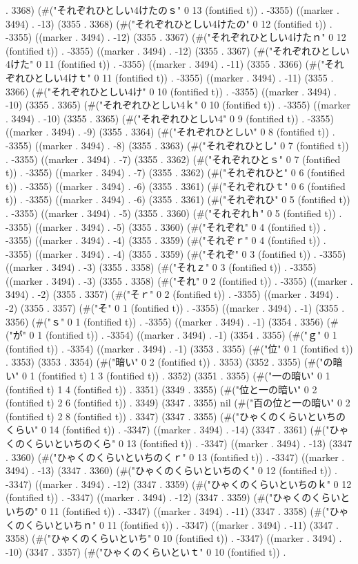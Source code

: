 . 3368) (#("それぞれひとしい4けたのｓ" 0 13 (fontified t)) . -3355) ((marker . 3494) . -13) (3355 . 3368) (#("それぞれひとしい4けたの" 0 12 (fontified t)) . -3355) ((marker . 3494) . -12) (3355 . 3367) (#("それぞれひとしい4けたｎ" 0 12 (fontified t)) . -3355) ((marker . 3494) . -12) (3355 . 3367) (#("それぞれひとしい4けた" 0 11 (fontified t)) . -3355) ((marker . 3494) . -11) (3355 . 3366) (#("それぞれひとしい4けｔ" 0 11 (fontified t)) . -3355) ((marker . 3494) . -11) (3355 . 3366) (#("それぞれひとしい4け" 0 10 (fontified t)) . -3355) ((marker . 3494) . -10) (3355 . 3365) (#("それぞれひとしい4ｋ" 0 10 (fontified t)) . -3355) ((marker . 3494) . -10) (3355 . 3365) (#("それぞれひとしい4" 0 9 (fontified t)) . -3355) ((marker . 3494) . -9) (3355 . 3364) (#("それぞれひとしい" 0 8 (fontified t)) . -3355) ((marker . 3494) . -8) (3355 . 3363) (#("それぞれひとし" 0 7 (fontified t)) . -3355) ((marker . 3494) . -7) (3355 . 3362) (#("それぞれひとｓ" 0 7 (fontified t)) . -3355) ((marker . 3494) . -7) (3355 . 3362) (#("それぞれひと" 0 6 (fontified t)) . -3355) ((marker . 3494) . -6) (3355 . 3361) (#("それぞれひｔ" 0 6 (fontified t)) . -3355) ((marker . 3494) . -6) (3355 . 3361) (#("それぞれひ" 0 5 (fontified t)) . -3355) ((marker . 3494) . -5) (3355 . 3360) (#("それぞれｈ" 0 5 (fontified t)) . -3355) ((marker . 3494) . -5) (3355 . 3360) (#("それぞれ" 0 4 (fontified t)) . -3355) ((marker . 3494) . -4) (3355 . 3359) (#("それぞｒ" 0 4 (fontified t)) . -3355) ((marker . 3494) . -4) (3355 . 3359) (#("それぞ" 0 3 (fontified t)) . -3355) ((marker . 3494) . -3) (3355 . 3358) (#("それｚ" 0 3 (fontified t)) . -3355) ((marker . 3494) . -3) (3355 . 3358) (#("それ" 0 2 (fontified t)) . -3355) ((marker . 3494) . -2) (3355 . 3357) (#("そｒ" 0 2 (fontified t)) . -3355) ((marker . 3494) . -2) (3355 . 3357) (#("そ" 0 1 (fontified t)) . -3355) ((marker . 3494) . -1) (3355 . 3356) (#("ｓ" 0 1 (fontified t)) . -3355) ((marker . 3494) . -1) (3354 . 3356) (#("が" 0 1 (fontified t)) . -3354) ((marker . 3494) . -1) (3354 . 3355) (#("ｇ" 0 1 (fontified t)) . -3354) ((marker . 3494) . -1) (3353 . 3355) (#("位" 0 1 (fontified t)) . 3353) (3353 . 3354) (#("暗い" 0 2 (fontified t)) . 3353) (3352 . 3355) (#("の暗い" 0 1 (fontified t) 1 3 (fontified t)) . 3352) (3351 . 3355) (#("一の暗い" 0 1 (fontified t) 1 4 (fontified t)) . 3351) (3349 . 3355) (#("位と一の暗い" 0 2 (fontified t) 2 6 (fontified t)) . 3349) (3347 . 3355) nil (#("百の位と一の暗い" 0 2 (fontified t) 2 8 (fontified t)) . 3347) (3347 . 3355) (#("ひゃくのくらいといちのくらい" 0 14 (fontified t)) . -3347) ((marker . 3494) . -14) (3347 . 3361) (#("ひゃくのくらいといちのくら" 0 13 (fontified t)) . -3347) ((marker . 3494) . -13) (3347 . 3360) (#("ひゃくのくらいといちのくｒ" 0 13 (fontified t)) . -3347) ((marker . 3494) . -13) (3347 . 3360) (#("ひゃくのくらいといちのく" 0 12 (fontified t)) . -3347) ((marker . 3494) . -12) (3347 . 3359) (#("ひゃくのくらいといちのｋ" 0 12 (fontified t)) . -3347) ((marker . 3494) . -12) (3347 . 3359) (#("ひゃくのくらいといちの" 0 11 (fontified t)) . -3347) ((marker . 3494) . -11) (3347 . 3358) (#("ひゃくのくらいといちｎ" 0 11 (fontified t)) . -3347) ((marker . 3494) . -11) (3347 . 3358) (#("ひゃくのくらいといち" 0 10 (fontified t)) . -3347) ((marker . 3494) . -10) (3347 . 3357) (#("ひゃくのくらいといｔ" 0 10 (fontified t)) . 